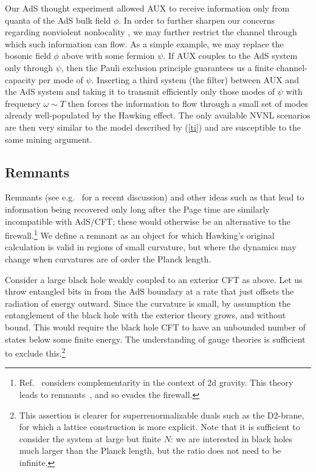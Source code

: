 \documentclass[12pt]{article}
\begin{document}
{Our AdS thought experiment allowed AUX to receive information only from quanta of the AdS bulk field $\phi$.  In order to further sharpen our concerns regarding
nonviolent nonlocality \cite{Giddings:2011ks,Giddings:2012gc,Giddings:2013kcj}, we may further restrict the channel through which such information can flow. As a simple example, we may replace the bosonic field $\phi$ above with some fermion $\psi$.  If AUX couples to the AdS system only through $\psi$, then the Pauli exclusion principle guarantees us a finite channel-capacity per mode of $\psi$. Inserting a third system (the filter) between AUX and the AdS system and taking it to transmit efficiently only those modes of $\psi$ with frequency $\omega \sim T$ then forces the information to flow through a small set of modes already well-populated by the Hawking effect.  The only available NVNL scenarios are then very similar to the model described by (\ref{ti}) and are susceptible to the same mining argument.

\subsection{Remnants}

Remnants (see e.g.~\cite{Ori:2012jx} for a recent discussion) and other ideas such as \cite{Ashtekar:2005cj} that lead to information being recovered only long after the Page time are similarly incompatible with AdS/CFT; these would otherwise be an alternative to the firewall.\footnote{Ref.~\cite{Kim:2013fv} considers complementarity in the context of 2d gravity.  This theory leads to remnants~\cite{AS}, and so evades the firewall.}  We define a remnant as an object for which Hawking's original calculation is valid in regions of small curvature, but where the dynamics may change when curvatures are of order the Planck length.

Consider a large black hole weakly coupled to an exterior CFT as above.  Let us throw entangled bits in from the AdS boundary at a rate that just offsets the radiation of energy outward.  Since the curvature is small, by assumption the entanglement of the black hole with the exterior theory grows, and without bound.  This would require the black hole CFT to have an unbounded number of states below some finite energy.  The understanding of gauge theories is sufficient to exclude this.\footnote{This assertion is clearer for superrenormalizable duals such as the D2-brane, for which a lattice construction is more explicit.  Note that it is sufficient to consider the system at large but finite $N$: we are interested in black holes much larger than the Planck length, but the ratio does not need to be infinite.}

}
\end{document}
